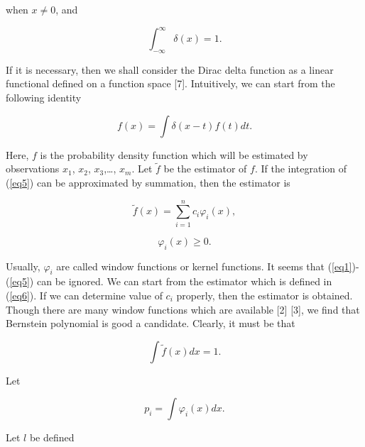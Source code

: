 \documentclass [18pt]{article}
\begin{document}
\noindent
when $x \ne 0$, and


\begin{equation}
\label{eq4}
\int_{ - \infty }^\infty {\delta (x) = 1} .
\end{equation}



If it is necessary, then we shall consider the Dirac delta function as a
linear functional defined on a function space [7]. Intuitively, we can start
from the following identity


\begin{equation}
\label{eq5}
f(x) = \int {\delta (x - t)f(t)dt} .
\end{equation}



Here, $f$ is the probability density function which will be estimated by
observations $x_1 $, $x_2 $, $x_3 $,\ldots , $x_m $. Let $\widetilde{f}$ be
the estimator of $f$. If the integration of (\ref{eq5}) can be approximated by
summation, then the estimator is


\begin{equation}
\label{eq6}
\widetilde{f}(x) = \sum\limits_{i = 1}^n {c_i } \varphi _i (x),
\end{equation}




\begin{equation}
\label{eq7}
\varphi _i (x) \ge 0.
\end{equation}



Usually, $\varphi _i $ are called window functions or kernel functions. It
seems that (\ref{eq1})-(\ref{eq5}) can be ignored. We can start from the estimator which is
defined in (\ref{eq6}). If we can determine value of $c_i $ properly, then the
estimator is obtained. Though there are many window functions which are
available [2] [3], we find that Bernstein polynomial is good a candidate.
Clearly, it must be that


\begin{equation}
\label{eq8}
\int {\widetilde{f}(x)dx = 1} .
\end{equation}



Let


\begin{equation}
\label{eq9}
p_i = \int {\varphi _i } (x)dx.
\end{equation}



Let $l$ be defined
\end{document}
